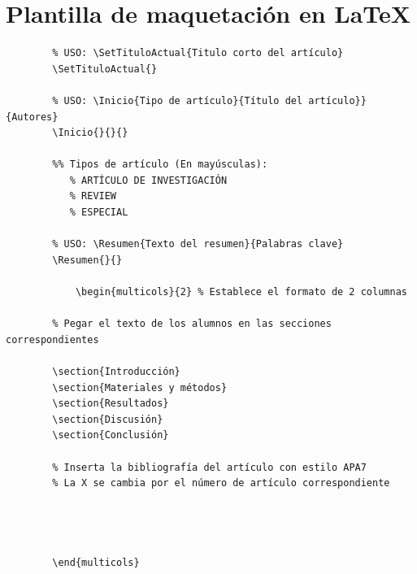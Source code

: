 \documentclass{ManualProyecto}
\begin{document}
    \frontmatter

\Portada
\Indices

    \mainmatter





    
    \appendix
    
\chapter{Plantilla de maquetación en LaTeX}\label{sec:plantilla_de_maquetación}
    \begin{verbatim}
        % USO: \SetTituloActual{Titulo corto del artículo}
        \SetTituloActual{}

        % USO: \Inicio{Tipo de artículo}{Título del artículo}}{Autores}   
        \Inicio{}{}{}

        %% Tipos de artículo (En mayúsculas):
           % ARTÍCULO DE INVESTIGACIÓN
           % REVIEW
           % ESPECIAL

        % USO: \Resumen{Texto del resumen}{Palabras clave}
        \Resumen{}{}

            \begin{multicols}{2} % Establece el formato de 2 columnas
            
        % Pegar el texto de los alumnos en las secciones correspondientes
        
        \section{Introducción}
        \section{Materiales y métodos}
        \section{Resultados}
        \section{Discusión}
        \section{Conclusión}

        % Inserta la bibliografía del artículo con estilo APA7
        % La X se cambia por el número de artículo correspondiente
        
        
        

        \end{multicols}
    \end{verbatim}
\end{document}
